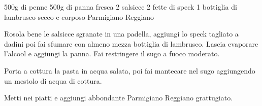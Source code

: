 \begin{ingreds}
	500g di penne
	500g di panna fresca
	2 salsicce
	2 fette di speck
	1 bottiglia di lambrusco secco e corposo
	Parmigiano Reggiano

\end{ingreds}

\begin{method}
Rosola bene le salsicce sgranate in una padella, aggiungi lo speck tagliato a dadini poi fai sfumare con almeno mezza bottiglia di lambrusco. Lascia evaporare l'alcool e aggiungi la panna. Fai restringere il sugo a fuoco moderato.

Porta a cottura la pasta in acqua salata, poi fai mantecare nel sugo aggiungendo un mestolo di acqua di cottura.

Metti nei piatti e aggiungi abbondante Parmigiano Reggiano grattugiato.



\end{method}



